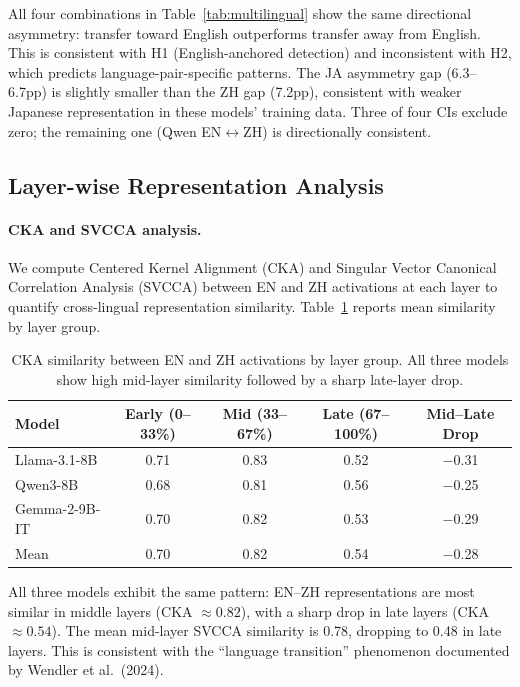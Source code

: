 \documentclass{article}
\begin{document}
All four combinations in Table~\ref{tab:multilingual} show the same directional asymmetry: transfer toward English outperforms transfer away from English. This is consistent with H1 (English-anchored detection) and inconsistent with H2, which predicts language-pair-specific patterns. The JA asymmetry gap (6.3--6.7pp) is slightly smaller than the ZH gap (7.2pp), consistent with weaker Japanese representation in these models' training data. Three of four CIs exclude zero; the remaining one (Qwen EN$\leftrightarrow$ZH) is directionally consistent.

\subsection{Layer-wise Representation Analysis}
\label{sec:layerwise}

\paragraph{CKA and SVCCA analysis.}
We compute Centered Kernel Alignment (CKA) and Singular Vector Canonical Correlation Analysis (SVCCA) between EN and ZH activations at each layer to quantify cross-lingual representation similarity. Table~\ref{tab:cka} reports mean similarity by layer group.

\begin{table}[t]
\centering
\caption{CKA similarity between EN and ZH activations by layer group. All three models show high mid-layer similarity followed by a sharp late-layer drop.}
\label{tab:cka}
\small
\begin{tabular}{lcccc}
\toprule
Model & Early (0--33\%) & Mid (33--67\%) & Late (67--100\%) & Mid--Late Drop \\
\midrule
Llama-3.1-8B & 0.71 & 0.83 & 0.52 & $-$0.31 \\
Qwen3-8B & 0.68 & 0.81 & 0.56 & $-$0.25 \\
Gemma-2-9B-IT & 0.70 & 0.82 & 0.53 & $-$0.29 \\
\midrule
Mean & 0.70 & 0.82 & 0.54 & $-$0.28 \\
\bottomrule
\end{tabular}
\end{table}

All three models exhibit the same pattern: EN--ZH representations are most similar in middle layers (CKA $\approx 0.82$), with a sharp drop in late layers (CKA $\approx 0.54$). The mean mid-layer SVCCA similarity is 0.78, dropping to 0.48 in late layers. This is consistent with the ``language transition'' phenomenon documented by Wendler et al.\ (2024).
\end{document}
